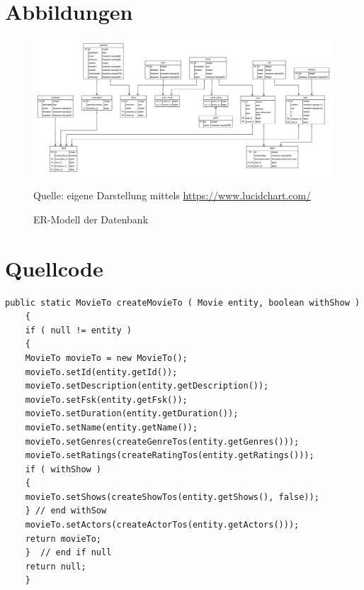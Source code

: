\chapter{Abbildungen}
\begin{figure}
	\centering 
	\includegraphics[keepaspectratio, width=1.0\textwidth, height=1.0\textheight]{img/ER-Modell}
	\captionsetup{format=hang}
	\caption{\acs{ER-Modell} der Datenbank}
	\small Quelle: eigene Darstellung mittels \url{https://www.lucidchart.com/}
	\label{fig:Anhang_ER-Modell}
\end{figure}

\chapter{Quellcode}
\begin{minipage}{\linewidth}
	\begin{lstlisting}[style=lstJava]
	public static MovieTo createMovieTo ( Movie entity, boolean withShow )
	{
	if ( null != entity )
	{
	MovieTo movieTo = new MovieTo();
	movieTo.setId(entity.getId());
	movieTo.setDescription(entity.getDescription());
	movieTo.setFsk(entity.getFsk());
	movieTo.setDuration(entity.getDuration());
	movieTo.setName(entity.getName());
	movieTo.setGenres(createGenreTos(entity.getGenres()));
	movieTo.setRatings(createRatingTos(entity.getRatings()));
	if ( withShow )
	{
	movieTo.setShows(createShowTos(entity.getShows(), false));
	} // end withSow
	movieTo.setActors(createActorTos(entity.getActors()));
	return movieTo;
	}  // end if null
	return null;
	}
	\end{lstlisting}
	\label{lst:EntityToToHelper_movie}
\end{minipage}

